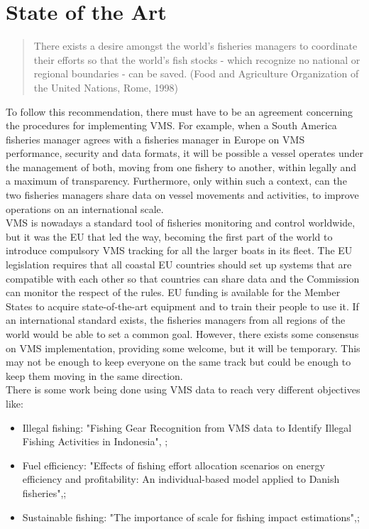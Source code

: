 

% 
% 
%
\chapter{State of the Art}
\label{cha:state_of_the_art}

\begin{quotation}
There exists a desire amongst the world's fisheries managers to coordinate their efforts so that the world's fish stocks - which recognize no national or regional boundaries - can be saved. \hfill (Food and Agriculture Organization of the United Nations, Rome, 1998)
\end{quotation}


To follow this recommendation, there must have to be an agreement concerning the procedures for implementing VMS. For example, when a South America fisheries manager agrees with a fisheries manager in Europe on VMS performance, security and data formats, it will be possible a vessel operates under the management of both, moving from one fishery to another, within legally and a maximum of transparency. Furthermore, only within such a context, can the two fisheries managers share data on vessel movements and activities, to improve operations on an international scale.\\
VMS is nowadays a standard tool of fisheries monitoring and control worldwide, but it was the EU that led the way, becoming the first part of the world to introduce compulsory VMS tracking for all the larger boats in its fleet. The EU legislation requires that all coastal EU countries should set up systems that are compatible with each other so that countries can share data and the Commission can monitor the respect of the rules. EU funding is available for the Member States to acquire state-of-the-art equipment and to train their people to use it. \cite{WEBSITE:EuropeanCommissionVMS}
If an international standard exists, the fisheries managers from all regions of the world would be able to set a common goal. However, there exists some consensus on VMS implementation, providing some welcome, but it will be temporary. This may not be enough to keep everyone on the same track but could be enough to keep them moving in the same direction.\\

There is some work being done using VMS data to reach very different objectives like:
\begin{itemize}
\item Illegal fishing: "Fishing Gear Recognition from VMS data to Identify Illegal Fishing Activities in Indonesia", \cite{MarzukiIllegalFishing};
\item Fuel efficiency: "Effects of fishing effort allocation scenarios on energy efficiency and profitability: An individual-based model applied to Danish fisheries",\cite{BastardieFishingEfficiency};
\item Sustainable fishing: "The importance of scale for fishing impact estimations",\cite{QuirijnsImportanceImpact};
\end{itemize}

